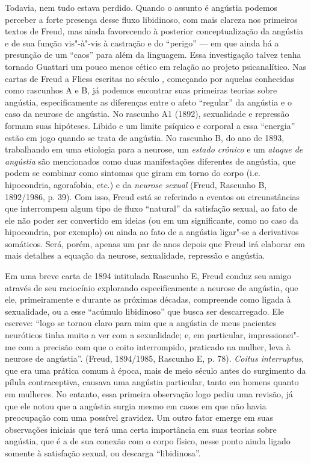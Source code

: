 Todavia, nem tudo estava perdido. Quando o assunto é angústia podemos
perceber a forte presença desse fluxo libidinoso, com mais clareza nos
primeiros textos de Freud, mas ainda favorecendo à posterior
conceptualização da angústia e de sua função vis"-à"-vis à castração e do
``perigo'' --- em que ainda há a presunção de um ``caos'' para além da
linguagem. Essa investigação talvez tenha tornado Guattari um pouco
menos cético em relação ao projeto psicanalítico. Nas cartas de Freud a
Fliess escritas no século , começando por aquelas conhecidas como
rascunhos A e B, já podemos encontrar suas primeiras teorias sobre
angústia, especificamente as diferenças entre o afeto ``regular'' da
angústia e o caso da neurose de angústia. No rascunho A1 (1892),
sexualidade e repressão formam suas hipóteses. Libido e um limite
psíquico e corporal a essa ``energia'' estão em jogo quando se trata de
angústia. No rascunho B, do ano de 1893, trabalhando em uma etiologia
para a neurose, um \emph{estado crônico} e um \emph{ataque de angústia}
são mencionados como duas manifestações diferentes de angústia, que
podem se combinar como sintomas que giram em torno do corpo (i.e.
hipocondria, agorafobia, etc.) e da \emph{neurose sexual} (Freud,
Rascunho B, 1892/1986, p. 39). Com isso, Freud está se referindo a
eventos ou circunstâncias que interrompem algum tipo de fluxo
``natural'' da satisfação sexual, ao fato de ele não poder ser
convertido em ideias (ou em um significante, como no caso da
hipocondria, por exemplo) ou ainda ao fato de a angústia ligar"-se a
derivativos somáticos. Será, porém, apenas um par de anos depois que
Freud irá elaborar em mais detalhes a equação da neurose, sexualidade,
repressão e angústia.

Em uma breve carta de 1894 intitulada Rascunho E, Freud conduz seu amigo
através de seu raciocínio explorando especificamente a neurose de
angústia, que ele, primeiramente e durante as próximas décadas,
compreende como ligada à sexualidade, ou a esse ``acúmulo libidinoso''
que busca ser descarregado. Ele escreve: ``logo se tornou claro para mim
que a angústia de meus pacientes neuróticos tinha muito a ver com a
sexualidade; e, em particular, impressionei"-me com a precisão com que o
coito interrompido, praticado na mulher, leva à neurose de angústia''.
(Freud, 1894/1985, Rascunho E, p. 78). \emph{Coitus interruptus}, que
era uma prática comum à época, mais de meio século antes do surgimento
da pílula contraceptiva, causava uma angústia particular, tanto em
homens quanto em mulheres. No entanto, essa primeira observação logo
pediu uma revisão, já que ele notou que a angústia surgia mesmo em casos
em que não havia preocupação com uma possível gravidez. Um outro fator
emerge em suas observações iniciais que terá uma certa importância em
suas teorias sobre angústia, que é a de sua conexão com o corpo físico,
nesse ponto ainda ligado somente à satisfação sexual, ou descarga
``libidinosa''.

